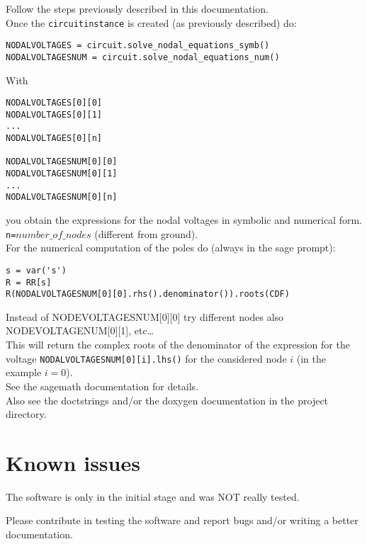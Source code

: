 \documentclass[a4paper]{article}
\begin{document}
Follow the steps previously described in this documentation.\\

Once the {\tt circuitinstance} is created (as previously described) do:
\begin{verbatim}
NODALVOLTAGES = circuit.solve_nodal_equations_symb()
NODALVOLTAGESNUM = circuit.solve_nodal_equations_num()
\end{verbatim}
With
\begin{verbatim}
NODALVOLTAGES[0][0]
NODALVOLTAGES[0][1]
...
NODALVOLTAGES[0][n]

NODALVOLTAGESNUM[0][0]
NODALVOLTAGESNUM[0][1]
...
NODALVOLTAGESNUM[0][n]
\end{verbatim}
you obtain the expressions for the nodal voltages in symbolic and numerical form. {\tt n=}$number\_of\_nodes$ (different from ground).\\

For the numerical computation of the poles do (always in the sage prompt):
\begin{verbatim}
s = var('s')
R = RR[s]
R(NODALVOLTAGESNUM[0][0].rhs().denominator()).roots(CDF)
\end{verbatim}
Instead of NODEVOLTAGESNUM[0][0] try different nodes also
NODEVOLTAGENUM[0][1], etc\ldots\\

This will return the complex roots of the denominator of the expression for the voltage {\tt NODALVOLTAGESNUM[0][i].lhs()} for the considered node $i$ (in the example $i=0$).\\

See the sagemath documentation for details.\\

Also see the doctstrings and/or the doxygen documentation in the project directory.


\section{Known issues}

The software is only in the initial stage and was NOT really tested. 

Please contribute in testing the software and report bugs and/or writing a better documentation.
\end{document}
